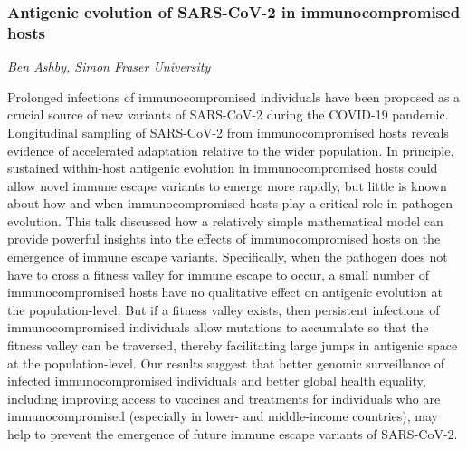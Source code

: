 \subsubsection*{Antigenic evolution of SARS-CoV-2 in immunocompromised hosts}
\textit{Ben Ashby, Simon Fraser University}

Prolonged infections of immunocompromised individuals have been proposed as a
crucial source of new variants of SARS-CoV-2 during the COVID-19 pandemic.
Longitudinal sampling of SARS-CoV-2 from immunocompromised hosts reveals
evidence of accelerated adaptation relative to the wider population. In
principle, sustained within-host antigenic evolution in immunocompromised hosts
could allow novel immune escape variants to emerge more rapidly, but little is
known about how and when immunocompromised hosts play a critical role in
pathogen evolution. This talk discussed how a relatively simple mathematical model
can provide powerful insights into the effects of immunocompromised hosts on the
emergence of immune escape variants. Specifically, when the pathogen does not
have to cross a fitness valley for immune escape to occur, a small number of
immunocompromised hosts have no qualitative effect on antigenic evolution at the
population-level. But if a fitness valley exists, then persistent infections of
immunocompromised individuals allow mutations to accumulate so that the fitness
valley can be traversed, thereby facilitating large jumps in antigenic space at
the population-level. Our results suggest that better genomic surveillance of
infected immunocompromised individuals and better global health equality,
including improving access to vaccines and treatments for individuals who are
immunocompromised (especially in lower- and middle-income countries), may help
to prevent the emergence of future immune escape variants of SARS-CoV-2.

